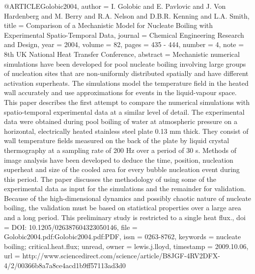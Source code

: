 {@ARTICLE{Golobic2004,
  author = {I. Golobic and E. Pavlovic and J. Von Hardenberg and M. Berry and
	R.A. Nelson and D.B.R. Kenning and L.A. Smith},
  title = {Comparison of a Mechanistic Model for Nucleate Boiling with Experimental
	Spatio-Temporal Data},
  journal = {Chemical Engineering Research and Design},
  year = {2004},
  volume = {82},
  pages = {435 - 444},
  number = {4},
  note = {8th UK National Heat Transfer Conference},
  abstract = {Mechanistic numerical simulations have been developed for pool nucleate
	boiling involving large groups of nucleation sites that are non-uniformly
	distributed spatially and have different activation superheats. The
	simulations model the temperature field in the heated wall accurately
	and use approximations for events in the liquid-vapour space. This
	paper describes the first attempt to compare the numerical simulations
	with spatio-temporal experimental data at a similar level of detail.
	The experimental data were obtained during pool boiling of water
	at atmospheric pressure on a horizontal, electrically heated stainless
	steel plate 0.13 mm thick. They consist of wall temperature fields
	measured on the back of the plate by liquid crystal thermography
	at a sampling rate of 200 Hz over a period of 30 s. Methods of image
	analysis have been developed to deduce the time, position, nucleation
	superheat and size of the cooled area for every bubble nucleation
	event during this period. The paper discusses the methodology of
	using some of the experimental data as input for the simulations
	and the remainder for validation. Because of the high-dimensional
	dynamics and possibly chaotic nature of nucleate boiling, the validation
	must be based on statistical properties over a large area and a long
	period. This preliminary study is restricted to a single heat flux.},
  doi = {DOI: 10.1205/026387604323050146},
  file = {Golobic2004.pdf:Golobic2004.pdf:PDF},
  issn = {0263-8762},
  keywords = {nucleate boiling; critical.heat.flux; unread},
  owner = {lewis.j.lloyd},
  timestamp = {2009.10.06},
  url = {http://www.sciencedirect.com/science/article/B8JGF-4RV2DFX-4/2/00366b8a7a8ce4acd1b9ff57113ad3d0}
}

}
